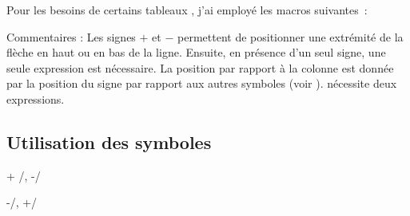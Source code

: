 \medskip
Pour les besoins de certains tableaux , j'ai employé les macros suivantes~:

\begin{tkzexample}
	\newcommand*{\va}{\colorbox{red!50}    {$\scriptscriptstyle V_a$}}
	\newcommand*{\vb}{\colorbox{blue!50}   {$\scriptscriptstyle V_b$}}
	\newcommand*{\vbo}{\colorbox{blue!50}  {$\scriptscriptstyle V_{b1}$}}
	\newcommand*{\vbt}{\colorbox{yellow!50}{$\scriptscriptstyle V_{b2}$}}
	\newcommand*{\vc}{\colorbox{gray!50}   {$\scriptscriptstyle V_c$}}
	\newcommand*{\vd}{\colorbox{magenta!50}{$\scriptscriptstyle V_d$}}
	\newcommand*{\ve}{\colorbox{orange!50} {$\scriptscriptstyle V_e$}}
\end{tkzexample}

\medskip
 \begin{center}
\end{center}

\begin{tkzexample}
\end{tkzexample}

Commentaires : Les signes $+$ et $-$ permettent de positionner une extrémité de la flèche en haut ou en bas de la ligne. Ensuite, en présence d'un seul signe, une seule expression est nécessaire. La position par rapport à la colonne est donnée par la position du signe par rapport aux autres symboles (voir ).   nécessite deux expressions.

\subsection{Utilisation des symboles}

\medskip
\bgroup\parindent=0pt
\begin{minipage}{7cm}
\begin{tkzexample}
 {+ /\va , -/\vb }
\end{tkzexample}
\end{minipage}
\hfill
\begin{minipage}{7cm}
\begin{tkzexample}
 {-/\va   ,   +/\vb}
\end{tkzexample}
\end{minipage}

